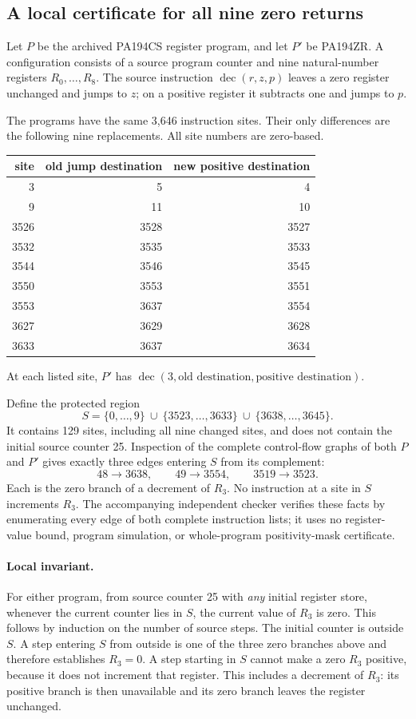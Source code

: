 \subsection{A local certificate for all nine zero returns}
Let $P$ be the archived PA194CS register program, and let $P'$ be
PA194ZR.  A configuration consists of a source program counter and nine
natural-number registers $R_0,\ldots,R_8$.  The source instruction
$\operatorname{dec}(r,z,p)$ leaves a zero register unchanged and jumps to
$z$; on a positive register it subtracts one and jumps to $p$.

The programs have the same 3,646 instruction sites.  Their only differences
are the following nine replacements.  All site numbers are zero-based.
\begin{center}
\begin{tabular}{r|r|r}
site & old jump destination & new positive destination\\\hline
3 & 5 & 4\\
9 & 11 & 10\\
3526 & 3528 & 3527\\
3532 & 3535 & 3533\\
3544 & 3546 & 3545\\
3550 & 3553 & 3551\\
3553 & 3637 & 3554\\
3627 & 3629 & 3628\\
3633 & 3637 & 3634
\end{tabular}
\end{center}
At each listed site, $P'$ has
$\operatorname{dec}(3,\text{old destination},\text{positive destination})$.

Define the protected region
\[
 S=\{0,\ldots,9\}\ \cup\ \{3523,\ldots,3633\}
     \ \cup\ \{3638,\ldots,3645\}.
\]
It contains 129 sites, including all nine changed sites, and does not contain
the initial source counter 25.  Inspection of the complete control-flow
graphs of both $P$ and $P'$ gives exactly three edges entering $S$ from its
complement:
\[
 48\longrightarrow3638,\qquad
 49\longrightarrow3554,\qquad
 3519\longrightarrow3523.
\]
Each is the zero branch of a decrement of $R_3$.  No instruction at a site
in $S$ increments $R_3$.  The accompanying independent checker verifies
these facts by enumerating every edge of both complete instruction lists;
it uses no register-value bound, program simulation, or whole-program
positivity-mask certificate.

\paragraph{Local invariant.}
For either program, from source counter 25 with \emph{any} initial register
store, whenever the current counter lies in $S$, the current value of $R_3$
is zero.  This follows by induction on the number of source steps.  The
initial counter is outside $S$.  A step entering $S$ from outside is one
of the three zero branches above and therefore establishes $R_3=0$.
A step starting in $S$ cannot make a zero $R_3$ positive, because it does
not increment that register.  This includes a decrement of $R_3$: its
positive branch is then unavailable and its zero branch leaves the register
unchanged.

